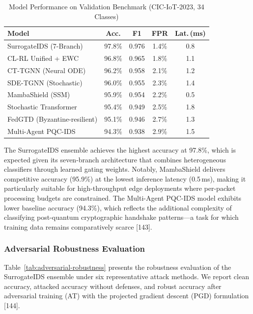\documentclass[12pt,a4paper]{article}
\begin{document}
\begin{table}[!htbp]
\centering
\caption{Model Performance on Validation Benchmark (CIC-IoT-2023, 34 Classes)}
\label{tab:model-performance}
\renewcommand{\arraystretch}{1.15}
\begin{tabular}{@{}lcccc@{}}
\toprule
\textbf{Model} & \textbf{Acc.} & \textbf{F1} & \textbf{FPR} & \textbf{Lat.\,(ms)} \\
\midrule
SurrogateIDS (7-Branch)      & 97.8\% & 0.976 & 1.4\% & 0.8 \\
CL-RL Unified + EWC          & 96.8\% & 0.965 & 1.8\% & 1.1 \\
CT-TGNN (Neural ODE)         & 96.2\% & 0.958 & 2.1\% & 1.2 \\
SDE-TGNN (Stochastic)        & 96.0\% & 0.955 & 2.3\% & 1.4 \\
MambaShield (SSM)             & 95.9\% & 0.954 & 2.2\% & 0.5 \\
Stochastic Transformer        & 95.4\% & 0.949 & 2.5\% & 1.8 \\
FedGTD (Byzantine-resilient)  & 95.1\% & 0.946 & 2.7\% & 1.3 \\
Multi-Agent PQC-IDS           & 94.3\% & 0.938 & 2.9\% & 1.5 \\
\bottomrule
\end{tabular}
\end{table}

The SurrogateIDS ensemble achieves the highest accuracy at 97.8\%, which is
expected given its seven-branch architecture that combines heterogeneous
classifiers through learned gating weights. Notably, MambaShield delivers
competitive accuracy (95.9\%) at the lowest inference latency (0.5\,ms),
making it particularly suitable for high-throughput edge deployments where
per-packet processing budgets are constrained. The Multi-Agent PQC-IDS model
exhibits lower baseline accuracy (94.3\%), which reflects the additional
complexity of classifying post-quantum cryptographic handshake patterns---a
task for which training data remains comparatively scarce [143].

\subsubsection{Adversarial Robustness Evaluation}

Table~\ref{tab:adversarial-robustness} presents the robustness evaluation
of the SurrogateIDS ensemble under six representative attack methods. We
report clean accuracy, attacked accuracy without defenses, and robust
accuracy after adversarial training (AT) with the projected gradient descent
(PGD) formulation [144].
\end{document}
